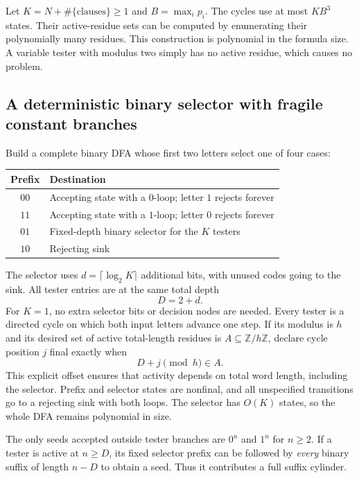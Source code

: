 \documentclass[11pt,letterpaper]{article}
\theoremstyle{definition}
\theoremstyle{remark}
\begin{document}
Let $K=N+\#\{\text{clauses}\}\ge1$ and $B=\max_i p_i$. The cycles use at most $KB^3$ states. Their active-residue sets can be computed by enumerating their polynomially many residues. This construction is polynomial in the formula size. A variable tester with modulus two simply has no active residue, which causes no problem.

\subsection{A deterministic binary selector with fragile constant branches}

Build a complete binary DFA whose first two letters select one of four cases:
\begin{center}
\begin{tabular}{cl}
\toprule
Prefix & Destination\\
\midrule
$00$ & Accepting state with a $0$-loop; letter $1$ rejects forever\\
$11$ & Accepting state with a $1$-loop; letter $0$ rejects forever\\
$01$ & Fixed-depth binary selector for the $K$ testers\\
$10$ & Rejecting sink\\
\bottomrule
\end{tabular}
\end{center}
The selector uses $d=\lceil\log_2 K\rceil$ additional bits, with unused codes going to the sink. All tester entries are at the same total depth
\[
D=2+d.
\]
For $K=1$, no extra selector bits or decision nodes are needed. Every tester is a directed cycle on which both input letters advance one step. If its modulus is $h$ and its desired set of active total-length residues is $A\subseteq\mathbb Z/h\mathbb Z$, declare cycle position $j$ final exactly when
\[
D+j\pmod h\in A.
\]
This explicit offset ensures that activity depends on total word length, including the selector. Prefix and selector states are nonfinal, and all unspecified transitions go to a rejecting sink with both loops. The selector has $O(K)$ states, so the whole DFA remains polynomial in size.

The only seeds accepted outside tester branches are $0^n$ and $1^n$ for $n\ge2$. If a tester is active at $n\ge D$, its fixed selector prefix can be followed by \emph{every} binary suffix of length $n-D$ to obtain a seed. Thus it contributes a full suffix cylinder.
\end{document}
